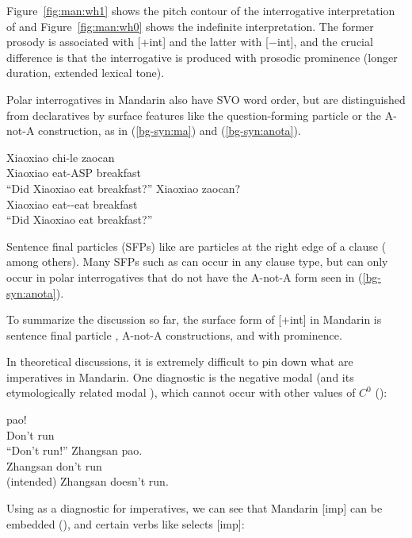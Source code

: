  Figure~\ref{fig:man:wh1} shows the pitch contour of the interrogative interpretation of \twh{} and Figure~\ref{fig:man:wh0} shows the indefinite interpretation. The former prosody is associated with [+int] and the latter with [$-$int], and the crucial difference is that the interrogative  is produced with prosodic prominence (longer duration, extended lexical tone). 

Polar interrogatives in Mandarin also have SVO word order, but are distinguished from declaratives by surface features like the question-forming particle  or the A-not-A construction, as in (\ref{bg-syn:ma}) and (\ref{bg-syn:anota}).

\gll Xiaoxiao	chi-le	zaocan		\\
Xiaoxiao	eat-ASP	breakfast	\Sfp{}\\
``Did Xiaoxiao eat breakfast?''
\eex
{}
\gll Xiaoxiao		zaocan?\\
	Xiaoxiao	eat-\Neg-eat	breakfast\\
	``Did Xiaoxiao eat breakfast?''
\eex


Sentence final particles (SFPs) like \ma{} are  particles at the right edge of a clause (\citealt{chao1968, zhudexi, huang1982, cheng1991, liboya2006} among others). Many SFPs such as  can occur in any clause type, but \ma{} can only occur in polar interrogatives that do not have the A-not-A form seen in (\ref{bg-syn:anota}). 




To summarize the discussion so far, the surface form of [+int] in Mandarin is sentence final particle \ma{}, A-not-A constructions, and \twh{} with prominence. 

In theoretical discussions, it is extremely difficult to pin down what are imperatives in Mandarin. One diagnostic is the negative modal  (and its etymologically related modal ), which cannot occur with other values of $C^{0}$ (\cite{chao1968, lithompson}):

\bxl\label{ex:man:bie:imp}
\gll {} pao!\\
Don't run\\
``Don't run!''
\ex 
\gll *Zhangsan  pao.\\
Zhangsan don't run\\
(intended) Zhangsan doesn't run.
\exl
\eex 

Using  as a diagnostic for imperatives, we can see that Mandarin [imp] can be embedded (\cite{lithompson, chen2005imp}), and certain verbs like  selects [imp]:

